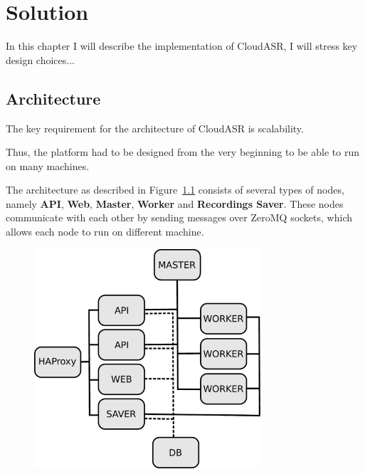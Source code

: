 \chapter{Solution}
In this chapter I will describe the implementation of CloudASR,
  I will stress key design choices...

\section{Architecture}
The key requirement for the architecture of CloudASR is scalability.


Thus, the platform had to be designed from the very beginning to be able to run on many machines.



The architecture as described in Figure~\ref{fig:architecture} consists of several types of nodes,
  namely \textbf{API}, \textbf{Web}, \textbf{Master}, \textbf{Worker} and \textbf{Recordings Saver}.
These nodes communicate with each other by sending messages over ZeroMQ sockets,
  which allows each node to run on different machine.

\begin{figure}
  \centering
  \includegraphics[width=0.75\textwidth]{./img/architecture.pdf}

  \label{fig:architecture}
  \caption{}
\end{figure}



